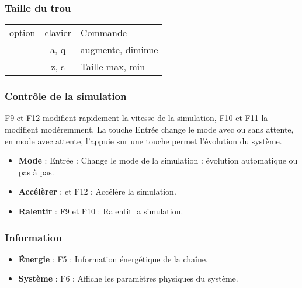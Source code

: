 \subsubsection{Taille du trou}
%
\begin{center}
\begin{tabular}{ccl}
option & clavier & Commande \\
& {\sf a},  {\sf q} & augmente, diminue\\
& {\sf z},  {\sf s} & Taille max, min\\
\end{tabular}
\end{center}
%
%
\subsubsection{Contrôle de la simulation}
%
{\sf F9} et {\sf F12} modifient rapidement la vitesse de la simulation, {\sf F10} et {\sf F11} la modifient modéremment. La touche {\sf Entrée} change le mode avec ou sans attente, en mode avec attente, l'appuie sur une touche permet l'évolution du système.
%
\begin{itemize}[label=, leftmargin=2cm, itemsep=0pt]
\item {\bf Mode} : {\sf Entrée} : Change le mode de la simulation : évolution automatique ou pas à pas.
\item {\bf Accélèrer} : {} et {\sf F12} : Accélère la simulation.
\item {\bf Ralentir} : {\sf F9} et {\sf F10} : Ralentit la simulation.
\end{itemize}
%
%
\subsubsection{Information}
\begin{itemize}[label=, leftmargin=2cm, itemsep=0pt]
\item {\bf Énergie} : {\sf F5} : Information énergétique de la chaîne.
\item {\bf Système} : {\sf F6} : Affiche les paramètres physiques du système.
\end{itemize}
%
